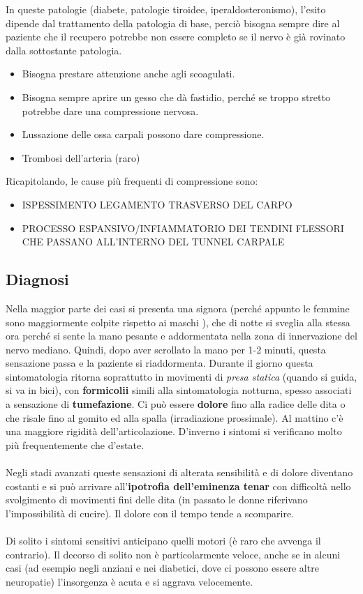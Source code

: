 In queste patologie (diabete, patologie tiroidee, iperaldosteronismo), l'esito dipende dal trattamento della patologia di base, perciò bisogna sempre dire al paziente che il recupero potrebbe non essere completo se il nervo è già rovinato dalla sottostante patologia.

\begin{itemize}
\item
  Bisogna prestare attenzione anche agli scoagulati.
\item
  Bisogna sempre aprire un gesso che dà fastidio, perché se troppo stretto potrebbe dare una compressione nervosa.
\item
  Lussazione delle ossa carpali possono dare compressione.
\item
  Trombosi dell'arteria (raro)
\end{itemize}

Ricapitolando, le cause più frequenti di compressione sono:

\begin{itemize}
\item
  ISPESSIMENTO LEGAMENTO TRASVERSO DEL CARPO
\item
  PROCESSO ESPANSIVO/INFIAMMATORIO DEI TENDINI FLESSORI CHE PASSANO ALL'INTERNO DEL TUNNEL CARPALE
\end{itemize}

\subsection{Diagnosi}

Nella maggior parte dei casi si presenta una signora (perché appunto le femmine sono maggiormente colpite rispetto ai maschi ), che di notte si sveglia alla stessa ora perché si sente la mano pesante e addormentata nella zona di innervazione del nervo mediano.
Quindi, dopo aver scrollato la mano per 1-2 minuti, questa sensazione passa e la paziente si riaddormenta.
Durante il giorno questa sintomatologia ritorna soprattutto in movimenti di \emph{presa statica} (quando si guida, si va in bici), con \textbf{formicolii} simili alla sintomatologia notturna, spesso associati a sensazione di \textbf{tumefazione}.
Ci può essere \textbf{dolore} fino alla radice delle dita o che risale fino al gomito ed alla spalla (irradiazione prossimale).
Al mattino c'è una maggiore rigidità dell'articolazione.
D'inverno i sintomi si verificano molto più frequentemente che d'estate.
\\\\
Negli stadi avanzati queste sensazioni di alterata sensibilità e di dolore diventano costanti e si può arrivare all'\textbf{ipotrofia dell'eminenza tenar} con difficoltà nello svolgimento di movimenti fini delle dita (in passato le donne riferivano l'impossibilità di cucire). Il dolore con il tempo tende a scomparire.
\\\\
Di solito i sintomi sensitivi anticipano quelli motori (è raro che avvenga il contrario).
Il decorso di solito non è particolarmente veloce, anche se in alcuni casi (ad esempio negli anziani e nei diabetici, dove ci possono essere altre neuropatie) l'insorgenza è acuta e si aggrava velocemente.

